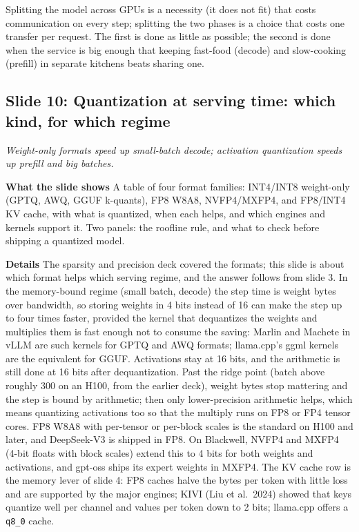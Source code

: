 \documentclass[11pt,letterpaper]{article}
\newcommand{\slide}[3]{%
  \subsection[Slide #1: #2]{Slide #1: #2}%
  {\color{muted}\itshape #3\par}\medskip}
\newcommand{\para}[1]{\medskip\noindent\textbf{#1}\quad}
\newenvironment{intuition}{\begin{tcolorbox}[intuitionbox]}{\end{tcolorbox}}
\begin{document}
\begin{intuition}
Splitting the model across GPUs is a necessity (it does not fit) that costs communication on every step; splitting the two phases is a choice that costs one transfer per request. The first is done as little as possible; the second is done when the service is big enough that keeping fast-food (decode) and slow-cooking (prefill) in separate kitchens beats sharing one.
\end{intuition}

\slide{10}{Quantization at serving time: which kind, for which regime}{Weight-only formats speed up small-batch decode; activation quantization speeds up prefill and big batches.}

\para{What the slide shows} A table of four format families: INT4/INT8 weight-only (GPTQ, AWQ, GGUF k-quants), FP8 W8A8, NVFP4/MXFP4, and FP8/INT4 KV cache, with what is quantized, when each helps, and which engines and kernels support it. Two panels: the roofline rule, and what to check before shipping a quantized model.

\para{Details} The sparsity and precision deck covered the formats; this slide is about which format helps which serving regime, and the answer follows from slide 3. In the memory-bound regime (small batch, decode) the step time is weight bytes over bandwidth, so storing weights in 4 bits instead of 16 can make the step up to four times faster, provided the kernel that dequantizes the weights and multiplies them is fast enough not to consume the saving: Marlin and Machete in vLLM are such kernels for GPTQ and AWQ formats; llama.cpp's ggml kernels are the equivalent for GGUF. Activations stay at 16 bits, and the arithmetic is still done at 16 bits after dequantization. Past the ridge point (batch above roughly 300 on an H100, from the earlier deck), weight bytes stop mattering and the step is bound by arithmetic; then only lower-precision arithmetic helps, which means quantizing activations too so that the multiply runs on FP8 or FP4 tensor cores. FP8 W8A8 with per-tensor or per-block scales is the standard on H100 and later, and DeepSeek-V3 is shipped in FP8. On Blackwell, NVFP4 and MXFP4 (4-bit floats with block scales) extend this to 4 bits for both weights and activations, and gpt-oss ships its expert weights in MXFP4. The KV cache row is the memory lever of slide 4: FP8 caches halve the bytes per token with little loss and are supported by the major engines; KIVI (Liu et al.\ 2024) showed that keys quantize well per channel and values per token down to 2 bits; llama.cpp offers a \texttt{q8\_0} cache.
\end{document}
